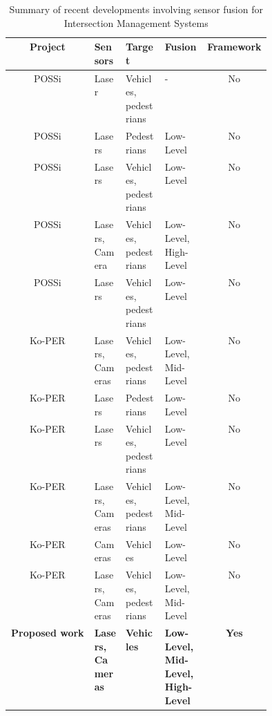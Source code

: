\begin{table}[!t]
\begin{tabular}{|c|p{0.125\linewidth}|p{0.15\linewidth}|p{0.16\linewidth}|c|}
\hline

\textbf{Project} & \textbf{Sensors} & \textbf{Target} & \textbf{Fusion} & \textbf{Framework} \\
\hline

POSSi \cite{Zhao2006}& Laser & Vehicles, pedestrians & - & No \\
\hline

POSSi \cite{Song2008}& Lasers & Pedestrians & Low-Level & No \\
\hline

POSSi \cite{Zhao2008}& Lasers & Vehicles, pedestrians & Low-Level & No \\
\hline

POSSi \cite{Zhao2009}& Lasers, Camera & Vehicles, pedestrians & Low-Level, High-Level & No \\
\hline

POSSi \cite{Zhao2012}& Lasers & Vehicles, pedestrians & Low-Level & No \\
\hline

Ko-PER \cite{Goldhammer2012} & Lasers, Cameras & Vehicles, pedestrians & Low-Level, Mid-Level & No \\
\hline

Ko-PER \cite{Meissner2012} & Lasers & Pedestrians & Low-Level & No \\
\hline

Ko-PER \cite{Meissner2013} & Lasers & Vehicles, pedestrians & Low-Level & No \\
\hline

Ko-PER \cite{Meissner2013a, Meissner2013b} & Lasers, Cameras & Vehicles, pedestrians & Low-Level, Mid-Level & No \\
\hline

Ko-PER \cite{Strigel2013}& Cameras & Vehicles & Low-Level & No \\
\hline

Ko-PER \cite{Meissner2014}& Lasers, Cameras & Vehicles, pedestrians & Low-Level, Mid-Level & No \\
\hline


\textbf{Proposed work} & \textbf{Lasers, Cameras} & \textbf{Vehicles} & \textbf{Low-Level, Mid-Level, High-Level} & \textbf{Yes} \\
\hline

\end{tabular}
\caption{Summary of recent developments involving sensor fusion for Intersection Management Systems}
\label{summary_FusIMS}
\end{table}


